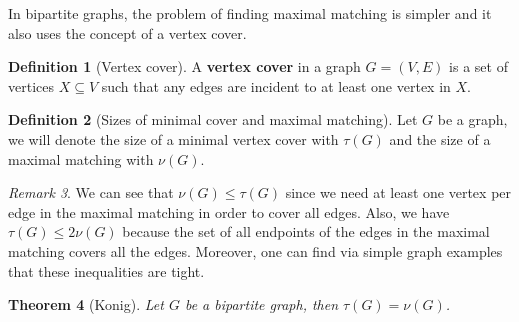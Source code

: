 \documentclass{tufte-handout}
\newtheorem{thm}{Theorem}
\theoremstyle{definition}
\newtheorem{defn}[thm]{Definition}
\theoremstyle{remark}
\newtheorem{rem}[thm]{Remark}
\begin{document}
In bipartite graphs, the problem of finding maximal matching is simpler and it also uses the concept of a vertex cover.

\begin{defn}[Vertex cover]
	A \textbf{vertex cover} in a graph $G = (V,E)$ is a set of vertices $X \subseteq V$ such that any edges are incident to at least one vertex in $X$.
\end{defn}
\begin{defn}[Sizes of minimal cover and maximal matching]
	Let $G$ be a graph, we will denote the size of a minimal vertex cover with $\tau(G)$ and the size of a maximal matching with $\nu(G)$.
\end{defn}
\begin{rem}
	We can see that $\nu(G) \leq \tau(G)$ since we need at least one vertex per edge in the maximal matching in order to cover all edges. Also, we have $\tau(G) \leq 2\nu(G)$ because the set of all endpoints of the edges in the maximal matching covers all the edges. Moreover, one can find via simple graph examples that these inequalities are tight.
\end{rem}
\begin{thm}[Konig]
	Let $G$ be a bipartite graph, then $\tau(G) = \nu(G)$.
\end{thm}
\end{document}
